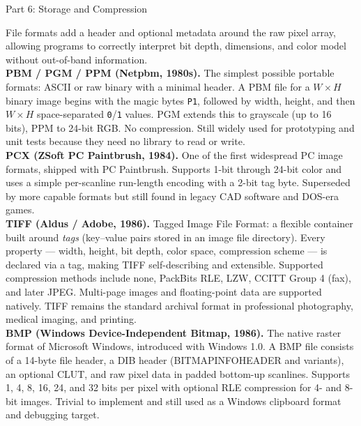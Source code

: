 \documentclass[letterpaper]{article}
\begin{document}
\begin{notes}{Part 6: Storage and Compression}

File formats add a header and optional metadata around the raw pixel array, allowing programs to correctly interpret bit depth, dimensions, and color model without out-of-band information.\\

\textbf{PBM / PGM / PPM (Netpbm, 1980s).} The simplest possible portable formats: ASCII or raw binary with a minimal header. A PBM file for a $W\times H$ binary image begins with the magic bytes \texttt{P1}, followed by width, height, and then $W\times H$ space-separated \texttt{0}/\texttt{1} values. PGM extends this to grayscale (up to 16 bits), PPM to 24-bit RGB. No compression. Still widely used for prototyping and unit tests because they need no library to read or write.\\

\textbf{PCX (ZSoft PC Paintbrush, 1984).} One of the first widespread PC image formats, shipped with PC Paintbrush. Supports 1-bit through 24-bit color and uses a simple per-scanline run-length encoding with a 2-bit tag byte. Superseded by more capable formats but still found in legacy CAD software and DOS-era games.\\

\textbf{TIFF (Aldus / Adobe, 1986).} Tagged Image File Format: a flexible container built around \emph{tags} (key--value pairs stored in an image file directory). Every property --- width, height, bit depth, color space, compression scheme --- is declared via a tag, making TIFF self-describing and extensible. Supported compression methods include none, PackBits RLE, LZW, CCITT Group 4 (fax), and later JPEG. Multi-page images and floating-point data are supported natively. TIFF remains the standard archival format in professional photography, medical imaging, and printing.\\

\textbf{BMP (Windows Device-Independent Bitmap, 1986).} The native raster format of Microsoft Windows, introduced with Windows 1.0. A BMP file consists of a 14-byte file header, a DIB header (BITMAPINFOHEADER and variants), an optional CLUT, and raw pixel data in padded bottom-up scanlines. Supports 1, 4, 8, 16, 24, and 32 bits per pixel with optional RLE compression for 4- and 8-bit images. Trivial to implement and still used as a Windows clipboard format and debugging target.\\


\end{notes}
\end{document}
